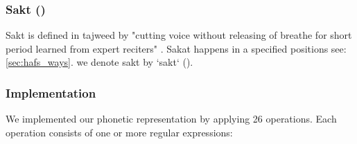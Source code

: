 \subsubsection{Sakt ()}

Sakt is defined in tajweed by "cutting voice without releasing of breathe for short period learned from expert reciters" \cite{AlHamad2008}. Sakat happens in a specified positions see: \ref{sec:hafs_ways}. we denote sakt by `sakt` ().



\subsubsection{Implementation}

We implemented our phonetic representation by applying 26 operations. Each operation consists of one or more regular expressions:


